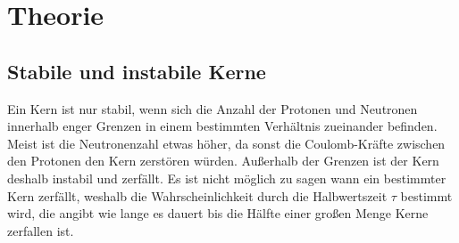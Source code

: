 \section{Theorie}
\label{sec:Theorie}

\subsection{Stabile und instabile Kerne}
Ein Kern ist nur stabil, wenn sich die Anzahl der Protonen und Neutronen innerhalb enger Grenzen in einem bestimmten Verhältnis zueinander befinden. Meist ist die Neutronenzahl etwas höher, da sonst die Coulomb-Kräfte zwischen den Protonen den Kern zerstören würden. Außerhalb der Grenzen ist der Kern deshalb instabil und zerfällt.
Es ist nicht möglich zu sagen wann ein bestimmter Kern zerfällt, weshalb die Wahrscheinlichkeit durch die Halbwertszeit $\tau$ bestimmt wird, die angibt wie lange es dauert bis die Hälfte einer großen Menge Kerne zerfallen ist.

